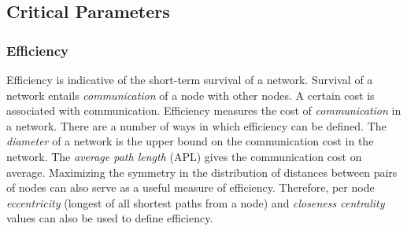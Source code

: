 \documentclass[twocolumn,showpacs,preprintnumbers,amsmath,amssymb]{revtex4}
\begin{document}
%
%
%
%

\subsection{Critical Parameters}

\subsubsection{Efficiency}
Efficiency is indicative of the short-term survival of a network. Survival of a network entails \textit{communication} of a node with other nodes. A certain cost is associated with communication. Efficiency measures the cost of \textit{communication} in a network. There are a number of ways in which efficiency can be defined. The \textit{diameter} of a network is the upper bound on the communication cost in the network. The \textit{average path length} (APL) gives the communication cost on average. Maximizing the symmetry in the distribution of distances between pairs of nodes can also serve as a useful measure of efficiency. Therefore, per node \textit{eccentricity} (longest of all shortest paths from a node) and \textit{closeness centrality} values can also be used to define efficiency.
\end{document}
